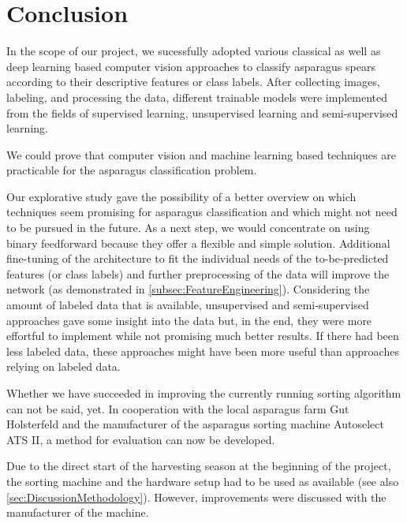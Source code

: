 \section{Conclusion}
\label{ch:Conclusion}

In the scope of our project, we sucessfully adopted various classical as well as deep learning based computer vision approaches to classify asparagus spears according to their descriptive features or class labels. After collecting images, labeling, and processing the data, different trainable models were implemented from the fields of supervised learning, unsupervised learning and semi-supervised learning.

\bigskip
We could prove that computer vision and machine learning based techniques are practicable for the asparagus classification problem.

Our explorative study gave the possibility of a better overview on which techniques seem promising for asparagus classification and which might not need to be pursued in the future. As a next step, we would concentrate on using binary feedforward  because they offer a flexible and simple solution. Additional fine-tuning of the architecture to fit the individual needs of the to-be-predicted features (or class labels) and further preprocessing of the data will improve the network (as demonstrated in \autoref{subsec:FeatureEngineering}). Considering the amount of labeled data that is available, unsupervised and semi-supervised approaches gave some insight into the data but, in the end, they were more effortful to implement while not promising much better results. If there had been less labeled data, these approaches might have been more useful than approaches relying on labeled data.

Whether we have succeeded in improving the currently running sorting algorithm can not be said, yet. In cooperation with the local asparagus farm Gut Holsterfeld and the manufacturer of the asparagus sorting machine Autoselect ATS II, a method for evaluation can now be developed. 


\bigskip
Due to the direct start of the harvesting season at the beginning of the project, the sorting machine and the hardware setup had to be used as available (see also \autoref{sec:DiscussionMethodology}). However, improvements were discussed with the manufacturer of the machine.

